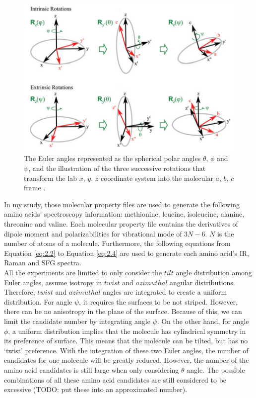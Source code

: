 \begin{figure}[!ht] 
\centering
\includegraphics[scale=0.5]{Figures/Euler_angles_represented_as_the_spherical_polar_angles.png} 
\caption{The Euler angles represented as the spherical polar angles $\theta$, $\phi$ and $\psi$, and the illustration of the three successive rotations that transform the lab $x$, $y$, $z$ coordinate system into the molecular $a$, $b$, $c$ frame \cite{hore0033-rotations}. }
\label{fig:2.1}
\end{figure}

In my study, those molecular property files are used to generate the following amino acids' spectroscopy information: methionine, leucine, isoleucine, alanine, threonine and valine. Each molecular property file contains the derivatives of dipole moment and polarizabilities for vibrational mode of $3N-6$. $N$ is the number of atoms of a molecule. Furthermore, the following equations from Equation \ref{eq:2.2} to Equation \ref{eq:2.4} are used to generate each amino acid's IR, Raman and SFG spectra. \\

All the experiments are limited to only consider the $tilt$ angle distribution among Euler angles, assume isotropy in $twist$ and $azimuthal$ angular distributions. Therefore, $twist$ and $azimuthal$ angles are integrated to create a uniform distribution. For angle $\psi$, it requires the surfaces to be not striped. However, there can be no anisotropy in the plane of the surface. Because of this, we can limit the candidate number by integrating angle $\psi$. On the other hand, for angle $\phi$, a uniform distribution implies that the molecule has cylindrical symmetry in its preference of surface. This means that the molecule can be tilted, but has no `twist' preference. With the integration of these two Euler angles, the number of candidates for one molecule will be greatly reduced. However, the number of the amino acid candidates is still large when only considering $\theta$ angle. The possible combinations of all these amino acid candidates are still considered to be excessive (TODO: put these into an approximated number). \\

